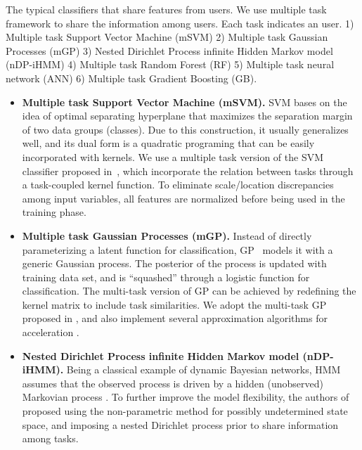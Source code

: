 The typical classifiers that share features from users. We use multiple task framework to share the information among users. Each task indicates an user. 1) Multiple task Support Vector Machine (mSVM) 2) Multiple task Gaussian Processes (mGP) 3) Nested Dirichlet Process infinite Hidden Markov model (nDP-iHMM) 4) Multiple task Random Forest (RF) 5) Multiple task neural network (ANN) 6) Multiple task Gradient Boosting (GB).


\begin{itemize}
\item
\textbf{Multiple task Support Vector Machine (mSVM).}
SVM \cite{bib:wang2005support} bases on the idea of optimal separating hyperplane that maximizes the separation margin of two data groups (classes).
Due to this construction, it usually generalizes well, and its dual form is a quadratic programing that can be easily incorporated with kernels.
We use a multiple task version of the SVM classifier proposed in~\cite{evgeniou2004regularized}, which incorporate the relation between tasks through a task-coupled kernel function. To eliminate scale/location discrepancies among input variables, all features are normalized before being used in the training phase.

\item
\textbf{Multiple task Gaussian Processes (mGP).}
Instead of directly parameterizing a latent function for classification, GP~\cite{bib:rasmussen2006gaussian} models it with a generic Gaussian process.
The posterior of the process is updated with training data set, and is ``squashed'' through a logistic function for classification. The multi-task version of GP can be achieved by redefining the kernel matrix to include task similarities. We adopt the multi-task GP proposed in \cite{bonilla2007multi}, and also implement several approximation algorithms for acceleration \cite{bib:chalupka2013framework}.

\item
\textbf{Nested Dirichlet Process infinite Hidden Markov model (nDP-iHMM).}
Being a classical example of dynamic Bayesian networks, HMM assumes that the observed process is driven by a hidden (unobserved) Markovian process \cite{bib:rabiner1986introduction}.  To further improve the model flexibility, the authors of \cite{ni2007multi} proposed using the non-parametric method for possibly undetermined state space, and imposing a nested Dirichlet process prior to share information among tasks.




\end{itemize}
